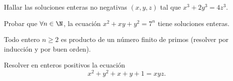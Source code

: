 \begin{exercise}
    Hallar las soluciones enteras no negativas $(x,y,z)$ tal que $x^3 + 2y^3 = 4z^3$.
\end{exercise}

\begin{problem}
    Probar que $\forall n \in \N$, la ecuación $x^2 + xy + y^2 = 7^n$ tiene soluciones enteras.
\end{problem}




\begin{problem}
    Todo entero $n \geq 2$ es producto de un número finito de primos (resolver por inducción y por buen orden).
\end{problem}

\begin{problem}
    Resolver en enteros positivos la ecuación
    \[
        x^2 + y^2 + x + y + 1 = xyz.
    \]
\end{problem}